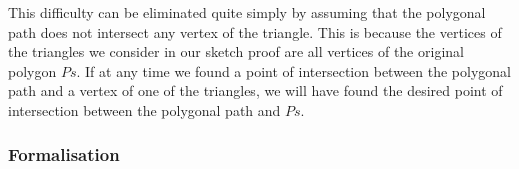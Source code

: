 This difficulty can be eliminated quite simply by assuming that the polygonal path does not intersect any vertex of the triangle. This is because the vertices of the triangles we consider in our sketch proof are all vertices of the original polygon $Ps$. If at any time we found a point of intersection between the polygonal path and a vertex of one of the triangles, we will have found the desired point of intersection between the polygonal path and $Ps$.\label{sec:NoVertexAssumption}


\subsubsection{Formalisation}



